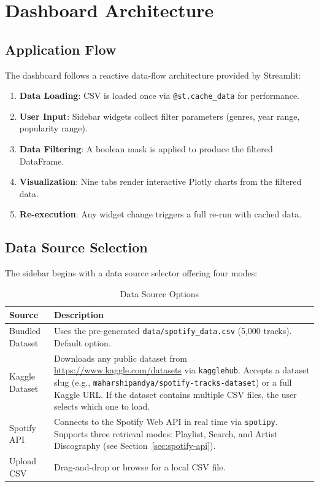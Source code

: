 \documentclass[12pt,a4paper]{article}
\begin{document}
\section{Dashboard Architecture}

\subsection{Application Flow}

The dashboard follows a reactive data-flow architecture provided by Streamlit:

\begin{enumerate}[noitemsep]
    \item \textbf{Data Loading}: CSV is loaded once via \texttt{@st.cache\_data} for performance.
    \item \textbf{User Input}: Sidebar widgets collect filter parameters (genres, year range, popularity range).
    \item \textbf{Data Filtering}: A boolean mask is applied to produce the filtered DataFrame.
    \item \textbf{Visualization}: Nine tabs render interactive Plotly charts from the filtered data.
    \item \textbf{Re-execution}: Any widget change triggers a full re-run with cached data.
\end{enumerate}

\subsection{Data Source Selection}

The sidebar begins with a data source selector offering four modes:

\begin{table}[H]
\centering
\caption{Data Source Options}
\begin{tabular}{@{}lp{8cm}@{}}
\toprule
\textbf{Source} & \textbf{Description} \\
\midrule
Bundled Dataset & Uses the pre-generated \texttt{data/spotify\_data.csv} (5{,}000 tracks). Default option. \\
Kaggle Dataset  & Downloads any public dataset from \url{https://www.kaggle.com/datasets} via \texttt{kagglehub}. Accepts a dataset slug (e.g., \texttt{maharshipandya/spotify-tracks-dataset}) or a full Kaggle URL. If the dataset contains multiple CSV files, the user selects which one to load. \\
Spotify API     & Connects to the Spotify Web API in real time via \texttt{spotipy}. Supports three retrieval modes: Playlist, Search, and Artist Discography (see Section~\ref{sec:spotify-api}). \\
Upload CSV      & Drag-and-drop or browse for a local CSV file. \\
\bottomrule
\end{tabular}
\end{table}
\end{document}
